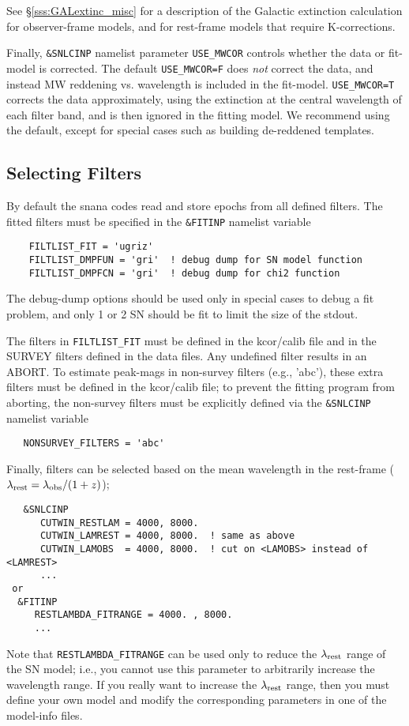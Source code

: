 \documentclass[12pt]{article}
\newcommand{\lamobs}{\lambda_{\rm obs}}
\newcommand{\lamrest}{\lambda_{\rm rest}}
\begin{document}
See \S\ref{sss:GALextinc_misc} for a description
of the Galactic extinction calculation for observer-frame
models, and for rest-frame models that require K-corrections.

Finally, {\tt \&SNLCINP} namelist parameter
{\tt USE\_MWCOR} controls whether the data or fit-model
is corrected.  The default {\tt USE\_MWCOR=F} does
{\em not} correct the data, and instead MW reddening
vs. wavelength is included in the fit-model.
{\tt USE\_MWCOR=T} corrects the data 
approximately, using the extinction at the central wavelength
of each filter band, and is then ignored in the fitting model.
We recommend using the default, except for special cases
such as building de-reddened templates.




  \clearpage
  \subsection{Selecting Filters}
  \label{subsec:select_filters}

By default the snana codes read and store epochs from
all defined filters. The fitted filters must be specified
in the {\tt \&FITINP} namelist variable
%
\begin{verbatim}
    FILTLIST_FIT = 'ugriz'    
    FILTLIST_DMPFUN = 'gri'  ! debug dump for SN model function
    FILTLIST_DMPFCN = 'gri'  ! debug dump for chi2 function
\end{verbatim}
%
The debug-dump options should be used only in special
cases to debug a fit problem, and only 1 or 2 SN should
be fit to limit the size of the stdout.


The filters in {\tt FILTLIST\_FIT} must be defined in 
the kcor/calib file and in the SURVEY filters defined
in the data files. Any undefined filter results in an ABORT.
To estimate peak-mags in non-survey filters (e.g., 'abc'), 
these extra filters must be defined in the kcor/calib file;
to prevent the fitting program from aborting, 
the non-survey filters must be explicitly defined
via the {\tt \&SNLCINP} namelist variable
%
\begin{verbatim}
   NONSURVEY_FILTERS = 'abc'
\end{verbatim}

\bigskip\noindent
Finally, filters can be selected based on the mean wavelength
in the rest-frame ($\lamrest = \lamobs/(1+z)$);
%
\begin{verbatim}
   &SNLCINP
      CUTWIN_RESTLAM = 4000, 8000.
      CUTWIN_LAMREST = 4000, 8000.  ! same as above
      CUTWIN_LAMOBS  = 4000, 8000.  ! cut on <LAMOBS> instead of <LAMREST>
      ...
 or    
  &FITINP
     RESTLAMBDA_FITRANGE = 4000. , 8000.
     ...
\end{verbatim}
Note that {\tt RESTLAMBDA\_FITRANGE} can be used only to
reduce the $\lamrest$ range of the SN model; i.e., you
cannot use this parameter to arbitrarily increase the 
wavelength range. If you really want to increase the
$\lamrest$ range, then you must define your own model
and modify the corresponding parameters in one of the
model-info files.
\end{document}
